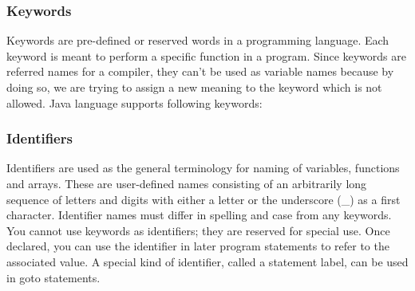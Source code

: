\documentclass[twocolumn, a4paper]{article}
\begin{document}
\subsubsection{Keywords}
Keywords are pre-defined or reserved words in a programming language. Each
keyword is meant to perform a specific function in a program. Since
keywords are referred names for a compiler, they can’t be used as variable
names because by doing so, we are trying to assign a new meaning to the
keyword which is not allowed. Java language supports following keywords:
\begin{table}[ht]
\end{table}

\subsubsection{Identifiers}
Identifiers are used as the general terminology for naming of variables,
functions and arrays. These are user-defined names consisting of an
arbitrarily long sequence of letters and digits with either a letter or the
underscore (\_) as a first character. Identifier names must differ in
spelling and case from any keywords. You cannot use keywords as
identifiers; they are reserved for special use. Once declared, you can use
the identifier in later program statements to refer to the associated
value. A special kind of identifier, called a statement label, can be used
in goto statements.
\end{document}
